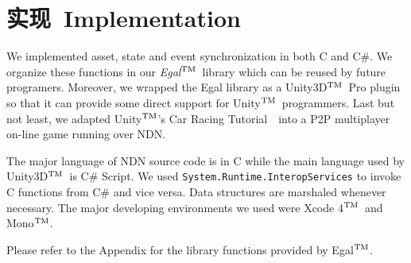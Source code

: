 \chapter{实现~Implementation}
\label{implementation}

\label{implementation}
\def\tm{\leavevmode\hbox{$\rm {}^{TM}$}} %

We implemented asset, state and event synchronization in both C and C\#. We organize these functions in our \emph{Egal}\tm~library which can be reused by future programers. Moreover, we wrapped the Egal library as a Unity3D\tm~Pro plugin so that it can provide some direct support for Unity\tm~programmers. Last but not least, we adapted Unity\tm's Car Racing Tutorial~\cite{UnityCar}~into a P2P multiplayer on-line game running over NDN.

The major language of NDN source code is in C while the main language used by Unity3D\tm~is C\# Script. We used \verb|System.Runtime.InteropServices| to invoke C functions from C\# and vice versa. Data structures are marshaled whenever necessary. The major developing environments we used were Xcode 4\tm~and Mono\tm.

Please refer to the Appendix for the library functions provided by Egal\tm.